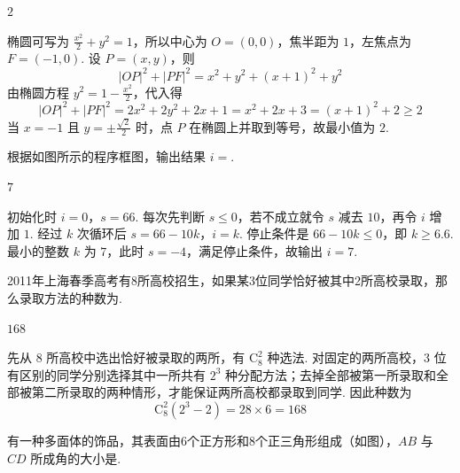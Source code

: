 \begin{answer}
\(2\)
\end{answer}

\begin{solution}
椭圆可写为 \(\frac{x^2}{2}+y^2=1\)，所以中心为 \(O=(0,0)\)，焦半距为 \(1\)，左焦点为 \(F=(-1,0)\). 设 \(P=(x,y)\)，则
\[
|OP|^2+|PF|^2=x^2+y^2+(x+1)^2+y^2
\]
由椭圆方程 \(y^2=1-\frac{x^2}{2}\)，代入得
\[
|OP|^2+|PF|^2
 =2x^2+2y^2+2x+1
 =x^2+2x+3
 =(x+1)^2+2\ge2
\]
当 \(x=-1\) 且 \(y=\pm\frac{\sqrt{2}}{2}\) 时，点 \(P\) 在椭圆上并取到等号，故最小值为 \(2\).
\end{solution}

\begin{problem}
根据如图所示的程序框图，输出结果 \(i=\)\fillinblank{}.

\end{problem}

\begin{answer}
\(7\)
\end{answer}

\begin{solution}
初始化时 \(i=0\)，\(s=66\). 每次先判断 \(s\le0\)，若不成立就令 \(s\) 减去 \(10\)，再令 \(i\) 增加 \(1\). 经过 \(k\) 次循环后
\(s=66-10k\)，\(i=k\).
停止条件是 \(66-10k\le0\)，即 \(k\ge6.6\). 最小的整数 \(k\) 为 \(7\)，此时 \(s=-4\)，满足停止条件，故输出 \(i=7\).
\end{solution}

\begin{problem}
2011年上海春季高考有8所高校招生，如果某3位同学恰好被其中2所高校录取，那么录取方法的种数为\fillinblank{}.
\end{problem}

\begin{answer}
\(168\)
\end{answer}

\begin{solution}
先从 \(8\) 所高校中选出恰好被录取的两所，有 \(\mathrm C_8^2\) 种选法. 对固定的两所高校，3 位有区别的同学分别选择其中一所共有 \(2^3\) 种分配方法；去掉全部被第一所录取和全部被第二所录取的两种情形，才能保证两所高校都录取到同学. 因此种数为
\[
\mathrm C_8^2(2^3-2)=28\times6=168
\]
\end{solution}

\begin{problem}
有一种多面体的饰品，其表面由6个正方形和8个正三角形组成（如图），\(AB\) 与 \(CD\) 所成角的大小是\fillinblank{}.

\end{problem}

